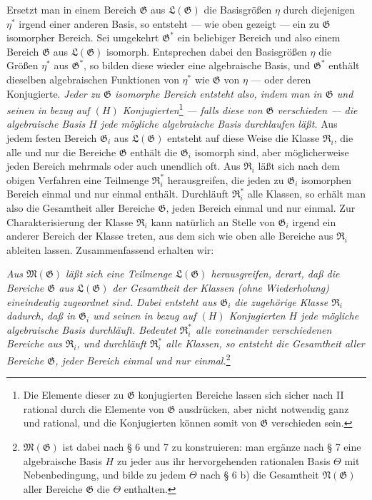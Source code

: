 \documentclass[11pt]{article}
\begin{document}
Ersetzt man in einem Bereich $\mathfrak G$ aus $\mathfrak L(\mathfrak G)$ die
Basisgrößen $\eta$ durch diejenigen $\eta^*$ irgend einer anderen Basis, so
entsteht --- wie oben gezeigt --- ein zu $\mathfrak G$ isomorpher Bereich. Sei
umgekehrt $\mathfrak G^*$ ein beliebiger Bereich und also einem Bereich
$\mathfrak G$ aus $\mathfrak L(\mathfrak G)$ isomorph. Entsprechen dabei den
Basisgrößen $\eta$ die Größen $\eta^*$ aus $\mathfrak G^*$, so bilden diese
wieder eine algebraische Basis, und $\mathfrak G^*$ enthält dieselben
algebraischen Funktionen von $\eta^*$ wie $\mathfrak G$ von $\eta$ --- oder
deren Konjugierte. \emph{Jeder zu $\mathfrak G$ isomorphe Bereich entsteht also,
indem man in $\mathfrak G$ und seinen in bezug auf $(H)$ Konjugierten}\footnote{Die
Elemente dieser zu $\mathfrak G$ konjugierten Bereiche lassen sich sicher nach
II rational durch die Elemente von $\mathfrak G$ ausdrücken, aber nicht
notwendig ganz und rational, und die Konjugierten können somit von $\mathfrak G$
verschieden sein.} \emph{--- falls diese von $\mathfrak G$ verschieden --- die
algebraische Basis $H$ jede mögliche algebraische Basis durchlaufen läßt.} Aus
jedem festen Bereich $\mathfrak G_i$ aus $\mathfrak L(\mathfrak G)$ entsteht auf
diese Weise die Klasse $\mathfrak R_i$, die alle und nur die Bereiche
$\mathfrak G$ enthält die $\mathfrak G_i$ isomorph sind, aber möglicherweise
jeden Bereich mehrmals oder auch unendlich oft. Aus $\mathfrak R_i$ läßt sich
nach dem obigen Verfahren eine Teilmenge $\mathfrak R_i^*$ herausgreifen, die
jeden zu $\mathfrak G_i$ isomorphen Bereich einmal und nur einmal enthält.
Durchläuft $\mathfrak R_i^*$ alle Klassen, so erhält man also die Gesamtheit
aller Bereiche $\mathfrak G$, jeden Bereich einmal und nur einmal. Zur
Charakterisierung der Klasse $\mathfrak R_i$ kann natürlich an Stelle von
$\mathfrak G_i$ irgend ein anderer Bereich der Klasse treten, aus dem sich wie
oben alle Bereiche aus $\mathfrak R_i$ ableiten lassen. Zusammenfassend erhalten
wir:

\emph{Aus $\mathfrak M(\mathfrak G)$ läßt sich eine Teilmenge
$\mathfrak L(\mathfrak G)$ herausgreifen, derart, daß die Bereiche $\mathfrak G$
aus $\mathfrak L(\mathfrak G)$ der Gesamtheit der Klassen (ohne Wiederholung)
eineindeutig zugeordnet sind. Dabei entsteht aus $\mathfrak G_i$ die zugehörige
Klasse $\mathfrak R_i$ dadurch, daß in $\mathfrak G_i$ und seinen in bezug auf
$(H)$ Konjugierten $H$ jede mögliche algebraische Basis durchläuft. Bedeutet
$\mathfrak R_i^*$ alle voneinander verschiedenen Bereiche aus $\mathfrak R_i$,
und durchläuft $\mathfrak R_i^*$ alle Klassen, so entsteht die Gesamtheit aller
Bereiche $\mathfrak G$, jeder Bereich einmal und nur einmal.}\footnote{$\mathfrak
M(\mathfrak G)$ ist dabei nach § 6 und 7 zu konstruieren: man ergänze nach § 7
eine algebraische Basis $H$ zu jeder aus ihr hervorgehenden rationalen Basis
$\Theta$ mit Nebenbedingung, und bilde zu jedem $\Theta$ nach § 6 b) die
Gesamtheit $\mathfrak N(\mathfrak G)$ aller Bereiche $\mathfrak G$ die $\Theta$
enthalten.}
\end{document}
